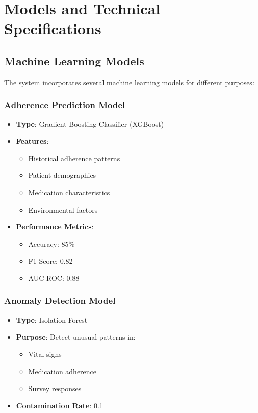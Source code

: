 \documentclass[12pt]{article}
\begin{document}
\section{Models and Technical Specifications}

\subsection{Machine Learning Models}
The system incorporates several machine learning models for different purposes:

\subsubsection{Adherence Prediction Model}
\begin{itemize}
    \item \textbf{Type}: Gradient Boosting Classifier (XGBoost)
    \item \textbf{Features}:
    \begin{itemize}
        \item Historical adherence patterns
        \item Patient demographics
        \item Medication characteristics
        \item Environmental factors
    \end{itemize}
    \item \textbf{Performance Metrics}:
    \begin{itemize}
        \item Accuracy: 85\%
        \item F1-Score: 0.82
        \item AUC-ROC: 0.88
    \end{itemize}
\end{itemize}

\subsubsection{Anomaly Detection Model}
\begin{itemize}
    \item \textbf{Type}: Isolation Forest
    \item \textbf{Purpose}: Detect unusual patterns in:
    \begin{itemize}
        \item Vital signs
        \item Medication adherence
        \item Survey responses
    \end{itemize}
    \item \textbf{Contamination Rate}: 0.1
\end{itemize}
\end{document}
